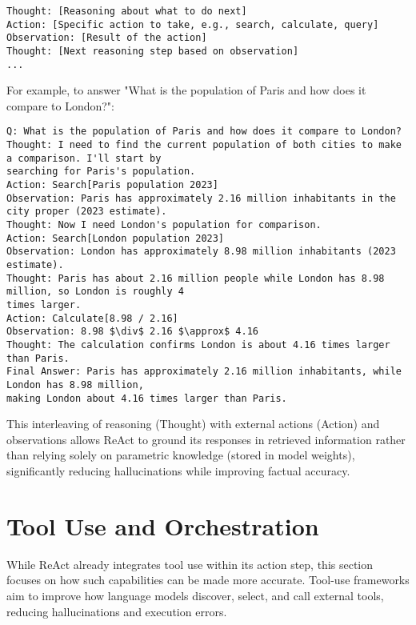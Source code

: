 \begin{lstlisting}[language={},basicstyle=\ttfamily\footnotesize,caption={ReAct Framework Pattern}]
Thought: [Reasoning about what to do next]
Action: [Specific action to take, e.g., search, calculate, query]
Observation: [Result of the action]
Thought: [Next reasoning step based on observation]
...
\end{lstlisting}

For example, to answer "What is the population of Paris and how does it compare to London?":

\begin{lstlisting}[language={},breaklines=true,basicstyle=\ttfamily\footnotesize,caption={ReAct Example: Population Comparison Query}]
Q: What is the population of Paris and how does it compare to London?
Thought: I need to find the current population of both cities to make a comparison. I'll start by 
searching for Paris's population.
Action: Search[Paris population 2023]
Observation: Paris has approximately 2.16 million inhabitants in the city proper (2023 estimate).
Thought: Now I need London's population for comparison.
Action: Search[London population 2023]
Observation: London has approximately 8.98 million inhabitants (2023 estimate).
Thought: Paris has about 2.16 million people while London has 8.98 million, so London is roughly 4 
times larger.
Action: Calculate[8.98 / 2.16]
Observation: 8.98 $\div$ 2.16 $\approx$ 4.16
Thought: The calculation confirms London is about 4.16 times larger than Paris.
Final Answer: Paris has approximately 2.16 million inhabitants, while London has 8.98 million, 
making London about 4.16 times larger than Paris.
\end{lstlisting}

This interleaving of reasoning (Thought) with external actions (Action) and observations allows ReAct to ground its responses in retrieved information rather than relying solely on parametric knowledge (stored in model weights), significantly reducing hallucinations while improving factual accuracy.
\section{Tool Use and Orchestration}

While ReAct already integrates tool use within its action step, this section focuses on how such capabilities can be made more accurate.  
Tool-use frameworks aim to improve how language models discover, select, and call external tools, reducing hallucinations and execution errors.  

